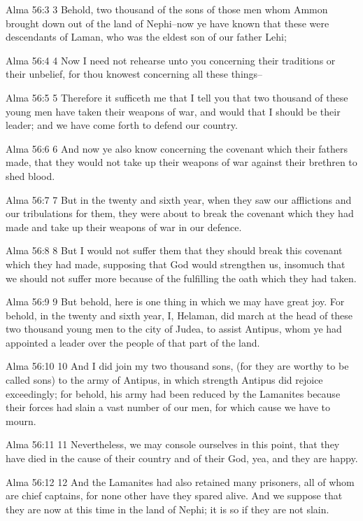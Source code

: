 Alma 56:3
 3 Behold, two thousand of the sons of those men whom Ammon
brought down out of the land of Nephi--now ye have known that
these were descendants of Laman, who was the eldest son of our
father Lehi;

Alma 56:4
 4 Now I need not rehearse unto you concerning their traditions
or their unbelief, for thou knowest concerning all these things--

Alma 56:5
 5 Therefore it sufficeth me that I tell you that two thousand of
these young men have taken their weapons of war, and would that I
should be their leader; and we have come forth to defend our
country.

Alma 56:6
 6 And now ye also know concerning the covenant which their
fathers made, that they would not take up their weapons of war
against their brethren to shed blood.

Alma 56:7
 7 But in the twenty and sixth year, when they saw our
afflictions and our tribulations for them, they were about to
break the covenant which they had made and take up their weapons
of war in our defence.

Alma 56:8
 8 But I would not suffer them that they should break this
covenant which they had made, supposing that God would strengthen
us, insomuch that we should not suffer more because of the
fulfilling the oath which they had taken.

Alma 56:9
 9 But behold, here is one thing in which we may have great joy.
For behold, in the twenty and sixth year, I, Helaman, did march
at the head of these two thousand young men to the city of Judea,
to assist Antipus, whom ye had appointed a leader over the people
of that part of the land.

Alma 56:10
 10 And I did join my two thousand sons, (for they are worthy to
be called sons) to the army of Antipus, in which strength Antipus
did rejoice exceedingly; for behold, his army had been reduced by
the Lamanites because their forces had slain a vast number of our
men, for which cause we have to mourn.

Alma 56:11
 11 Nevertheless, we may console ourselves in this point, that
they have died in the cause of their country and of their God,
yea, and they are happy.

Alma 56:12
 12 And the Lamanites had also retained many prisoners, all of
whom are chief captains, for none other have they spared alive.
And we suppose that they are now at this time in the land of
Nephi; it is so if they are not slain.

